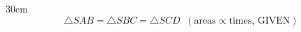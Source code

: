 \documentclass[border=4pt]{standalone}
\begin{document}
\begin{varwidth}{30em}
\large
\[ \triangle SAB = \triangle SBC = \triangle SCD \;\;(\text{areas} \propto \text{times, GIVEN}) \]

\end{varwidth}
\end{document}
